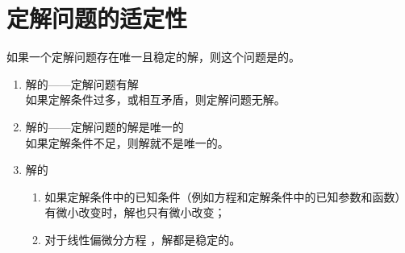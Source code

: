 \section{定解问题的适定性}
如果一个定解问题存在唯一且稳定的解，则这个问题是的。
\begin{enumerate}
	\item 解的——定解问题有解\\
	\hspace*{2em}如果定解条件过多，或相互矛盾，则定解问题无解。
	\item 解的——定解问题的解是唯一的\\
	\hspace*{2em} 如果定解条件不足，则解就不是唯一的。
	\item 解的
	\begin{enumerate}
		\item 如果定解条件中的已知条件（例如方程和定解条件中的已知参数和函数）有微小改变时，解也只有微小改变；
		\item 对于线性偏微分方程 ，解都是稳定的。
	\end{enumerate}
\end{enumerate}



